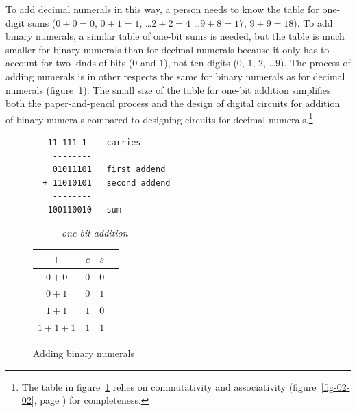 To add decimal numerals in this way, a person needs to know
the table for one-digit sums ($0+0=0$, $0+1=1$, \dots $2+2=4$ \dots $9+8=17$, $9+9=18$).
To add binary numerals, a similar table of one-bit sums is needed,
but the table is much smaller for binary numerals
than for decimal numerals because it only has to account for
two kinds of bits ($0$ and $1$), not ten digits ($0$, $1$, $2$, \dots $9$).
The process of adding numerals is in other respects
the same for binary numerals as for decimal numerals
(figure~\ref{fig:adding-binary-numerals}).
The small size of the table for one-bit addition simplifies
both the paper-and-pencil process and the design of
digital circuits for addition of binary numerals compared to
designing circuits for decimal numerals.\footnote{The table
in figure~\ref{fig:adding-binary-numerals}
relies on commutativity and associativity
(figure~\ref{fig-02-02}, page \pageref{fig-02-02})
for completeness.}

\begin{figure}[!tbp]
\begin{center}
\begin{minipage}[b]{0.4\textwidth}
\begin{verbatim}
   11 111 1    carries
    --------
    01011101   first addend
  + 11010101   second addend
    --------
   100110010   sum
\end{verbatim}
\end{minipage}
\hfill
\begin{minipage}[b]{0.4\textwidth}
~~~~~~\emph{one-bit addition}\\
\vspace{.05 in}
\begin{tabular}{|c|c|c|c}
 \hline
 $+$      & $c$ & $s$ \\
 \hline
 $0+0$    & $0$ & $0$ \\
 \hline
 $0+1$    & $0$ & $1$ \\
 \hline
 $1+1$    & $1$ & $0$ \\
 \hline
 $1+1+1$  & $1$ & $1$ \\
 \hline
\end{tabular}
\end{minipage}
\end{center}
\caption{Adding binary numerals}
\label{fig:adding-binary-numerals}
\end{figure}

